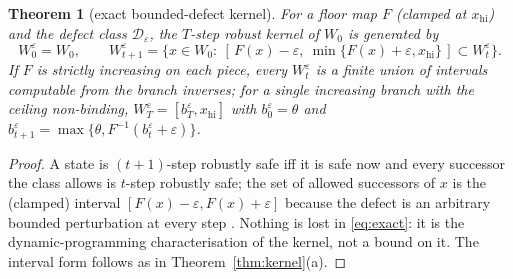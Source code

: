 \documentclass[11pt,a4paper]{article}
\theoremstyle{plain}
\newtheorem{theorem}{Theorem}[section]
\theoremstyle{definition}
\theoremstyle{remark}
\newcommand{\safe}{W_0}
\newcommand{\LRP}{\theta}
\begin{document}
\begin{theorem}[exact bounded-defect kernel]\label{thm:exact}
For a floor map $F$ (clamped at $x_{\mathrm{hi}}$) and the defect class $\mathcal D_\varepsilon$, the $T$-step robust kernel of $\safe$ is generated by
\begin{equation}\label{eq:exact}
W^{\varepsilon}_0=\safe,\qquad W^{\varepsilon}_{t+1}=\bigl\{x\in\safe:\ [\,F(x)-\varepsilon,\ \min\{F(x)+\varepsilon,x_{\mathrm{hi}}\}\,]\subset W^{\varepsilon}_t\bigr\}.
\end{equation}
If $F$ is strictly increasing on each piece, every $W^{\varepsilon}_t$ is a finite union of intervals computable from the branch inverses; for a single increasing branch with the ceiling non-binding, $W^{\varepsilon}_T=[b^{\varepsilon}_T,x_{\mathrm{hi}}]$ with $b^{\varepsilon}_0=\LRP$ and $b^{\varepsilon}_{t+1}=\max\{\LRP,F^{-1}(b^{\varepsilon}_t+\varepsilon)\}$.
\end{theorem}
\begin{proof}
A state is $(t{+}1)$-step robustly safe iff it is safe now and every successor the class allows is $t$-step robustly safe; the set of allowed successors of $x$ is the (clamped) interval $[F(x)-\varepsilon,F(x)+\varepsilon]$ because the defect is an arbitrary bounded perturbation at every step \cite{BertsekasRhodes1971,Aubin1991}. Nothing is lost in \eqref{eq:exact}: it is the dynamic-programming characterisation of the kernel, not a bound on it. The interval form follows as in Theorem~\ref{thm:kernel}(a).
\end{proof}
\end{document}
